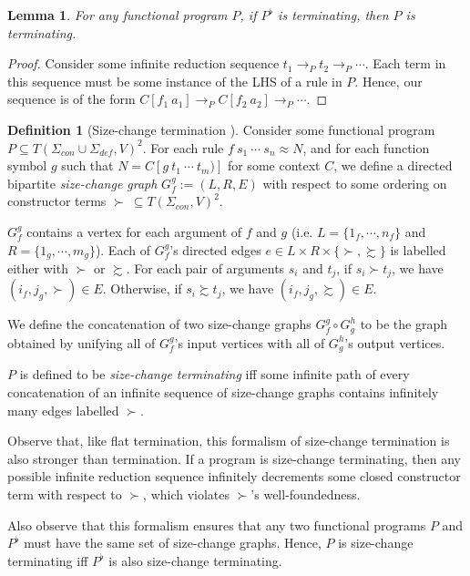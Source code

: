\documentclass{article}
\newtheorem{lemma}[theorem]{Lemma}
\theoremstyle{definition}
\newtheorem{definition}[theorem]{Definition}
\begin{document}
\begin{lemma}
    For any functional program $P$, if $P^\flat$ is terminating, then $P$ is terminating.
\end{lemma}
\begin{proof}
    Consider some infinite reduction sequence $t_1 \rightarrow_P t_2 \rightarrow_P \cdots$. Each term in this sequence must be some instance of the LHS of a rule in $P$. Hence, our sequence is of the form $C[f_1 ~ a_1] \rightarrow_P C[f_2 ~ a_2] \rightarrow_P \cdots$. 
\end{proof}

\begin{definition}[Size-change termination \cite{lee2001sizechange,thiemann2005sizechange}]
    Consider some functional program $P \subseteq T(\Sigma_{con} \cup \Sigma_{def}, V)^2$. For each rule $f ~ s_1 ~ \cdots ~ s_n \approx N$, and for each function symbol $g$ such that $N = C[g ~ t_1 ~ \cdots ~ t_m)]$ for some context $C$, we define a directed bipartite \emph{size-change graph} $G_f^g := (L, R, E)$ with respect to some ordering on constructor terms $\succ ~ \subseteq T(\Sigma_{con}, V)^2$.

    $G_f^g$ contains a vertex for each argument of $f$ and $g$ (i.e. $L = \{1_f, \cdots, n_f\}$ and $R = \{1_g, \cdots, m_g\}$). Each of $G_f^g$'s directed edges $e \in L \times R \times \{\succ, \succsim\}$ is labelled either with $\succ$ or $\succsim$. For each pair of arguments $s_i$ and $t_j$, if $s_i \succ t_j$, we have $(i_f, j_g, \succ) \in E$. Otherwise, if $s_i \succsim t_j$, we have $(i_f, j_g, \succsim) \in E$.

    We define the concatenation of two size-change graphs $G_f^g \circ G_g^h$ to be the graph obtained by unifying all of $G_f^g$'s input vertices with all of $G_g^h$'s output vertices.

   $P$ is defined to be \emph{size-change terminating} iff some infinite path of every concatenation of an infinite sequence of size-change graphs contains infinitely many edges labelled $\succ$.
\end{definition}
Observe that, like flat termination, this formalism of size-change termination is also stronger than termination. If a program is size-change terminating, then any possible infinite reduction sequence infinitely decrements some closed constructor term with respect to $\succ$, which violates $\succ$'s well-foundedness.

Also observe that this formalism ensures that any two functional programs $P$ and $P^\flat$ must have the same set of size-change graphs. Hence, $P$ is size-change terminating iff $P^\flat$ is also size-change terminating.
\end{document}
